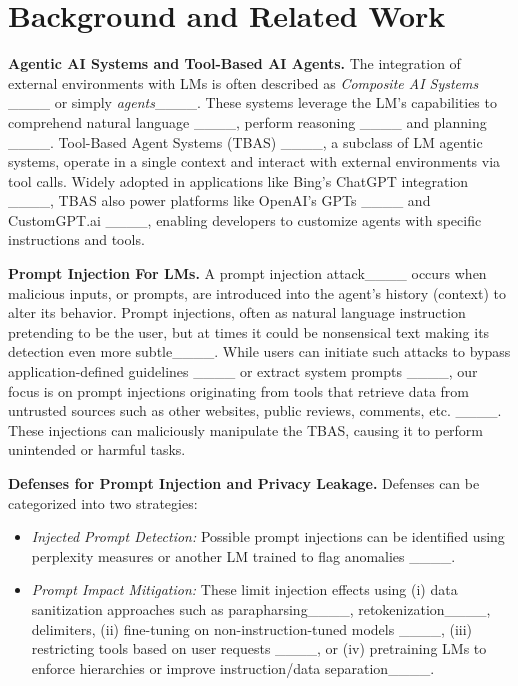\section{Background and Related Work}
\textbf{Agentic AI Systems and Tool-Based AI Agents.}
The integration of external environments with LMs is often described as \textit{Composite AI Systems} ____ or simply \textit{agents}____. These systems leverage the LM’s capabilities to comprehend natural language ____, perform reasoning ____ and planning ____. Tool-Based Agent Systems (TBAS) ____, a subclass of LM agentic systems, operate in a single context and interact with external environments via tool calls. Widely adopted in applications like Bing’s ChatGPT integration ____, TBAS also power platforms like OpenAI’s GPTs ____ and CustomGPT.ai ____, enabling developers to customize agents with specific instructions and tools.

\textbf{Prompt Injection For LMs.}
A prompt injection attack____ occurs when malicious inputs, or prompts, are introduced into the agent’s history (context) to alter its behavior. Prompt injections, often as natural language instruction pretending to be the user, but at times it could be nonsensical text making its detection even more subtle____. While users can initiate such attacks to bypass application-defined guidelines ____ or extract system prompts ____, our focus is on prompt injections originating from tools that retrieve data from untrusted sources such as other websites, public reviews, comments, etc. ____. These injections can maliciously manipulate the TBAS, causing it to perform unintended or harmful tasks. 

\textbf{Defenses for Prompt Injection and Privacy Leakage.} Defenses can be categorized into two strategies:
\begin{itemize}[noitemsep,topsep=0pt]
    \item \textit{Injected Prompt Detection:} Possible prompt injections can be identified using perplexity measures or another LM trained to flag anomalies ____.
    \item \textit{Prompt Impact Mitigation:} These limit injection effects using (i) data sanitization approaches such as parapharsing____, retokenization____, delimiters, (ii) fine-tuning on non-instruction-tuned models ____, (iii)
        restricting tools based on user requests ____, or (iv)
        pretraining LMs to enforce hierarchies or improve instruction/data separation____.
\end{itemize}

